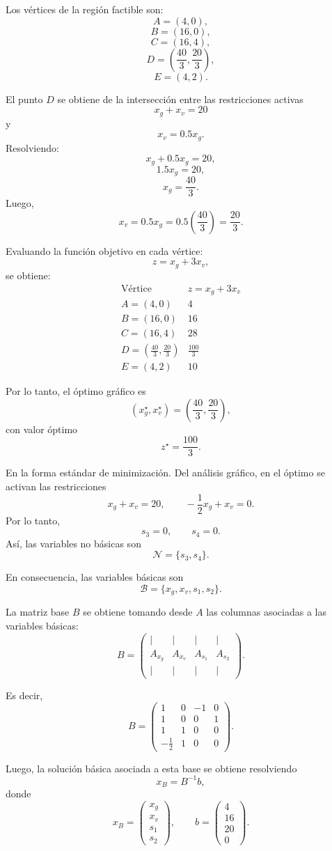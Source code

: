 \begin{enumerate}[label=\alph*)]
Los vértices de la región factible son:
\[
A=(4,0),
\]
\[
B=(16,0),
\]
\[
C=(16,4),
\]
\[
D=\left(\frac{40}{3},\frac{20}{3}\right),
\]
\[
E=(4,2).
\]

El punto \(D\) se obtiene de la intersección entre las restricciones activas
\[
x_g+x_v=20
\]
y
\[
x_v=0.5x_g.
\]
Resolviendo:
\[
x_g+0.5x_g=20,
\]
\[
1.5x_g=20,
\]
\[
x_g=\frac{40}{3}.
\]
Luego,
\[
x_v=0.5x_g
=
0.5\left(\frac{40}{3}\right)
=
\frac{20}{3}.
\]

Evaluando la función objetivo en cada vértice:
\[
z=x_g+3x_v,
\]
se obtiene:
\[
\begin{array}{c|c}
\text{Vértice} & z=x_g+3x_v \\ \hline
A=(4,0) & 4 \\
B=(16,0) & 16 \\
C=(16,4) & 28 \\
D=\left(\frac{40}{3},\frac{20}{3}\right) & \frac{100}{3} \\
E=(4,2) & 10
\end{array}
\]

Por lo tanto, el óptimo gráfico es
\[
(x_g^\star,x_v^\star)
=
\left(\frac{40}{3},\frac{20}{3}\right),
\]
con valor óptimo
\[
z^\star
=
\frac{100}{3}.
\]

En la forma estándar de minimización. Del análisis gráfico, en el óptimo se activan las restricciones
\[
x_g+x_v=20,
\qquad
-\frac{1}{2}x_g+x_v=0.
\]
Por lo tanto,
\[
s_3=0,
\qquad
s_4=0.
\]
Así, las variables no básicas son
\[
\mathcal{N}=\{s_3,s_4\}.
\]

En consecuencia, las variables básicas son
\[
\mathcal{B}=\{x_g,x_v,s_1,s_2\}.
\]

La matriz base \(B\) se obtiene tomando desde \(A\) las columnas asociadas a las variables básicas:
\[
B =
\begin{pmatrix}
\vert & \vert & \vert & \vert \\
A_{x_g} & A_{x_v} & A_{s_1} & A_{s_2} \\
\vert & \vert & \vert & \vert
\end{pmatrix}.
\]

Es decir,
\[
B =
\begin{pmatrix}
1 & 0 & -1 & 0 \\
1 & 0 & 0 & 1 \\
1 & 1 & 0 & 0 \\
-\frac{1}{2} & 1 & 0 & 0
\end{pmatrix}.
\]

Luego, la solución básica asociada a esta base se obtiene resolviendo
\[
x_B = B^{-1}b,
\]
donde
\[
x_B =
\begin{pmatrix}
x_g\\
x_v\\
s_1\\
s_2
\end{pmatrix},
\qquad
b =
\begin{pmatrix}
4\\
16\\
20\\
0
\end{pmatrix}.
\]


\end{enumerate}
